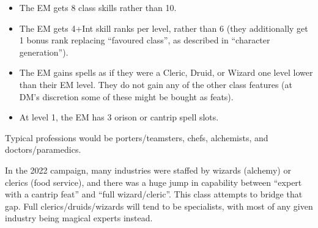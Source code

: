 \begin{itemize}
\item The EM gets 8 class skills rather than 10.
\item The EM gets 4+Int skill ranks per level, rather than 6 (they
additionally get 1 bonus rank replacing ``favoured class'', as described
in ``character generation'').
\item The EM gains spells as if they were a Cleric, Druid, or Wizard one
level lower than their EM level. They do not gain any of the other class
features (at DM's discretion some of these might be bought as feats).
\item At level 1, the EM has 3 orison or cantrip spell slots.
\end{itemize}
%

Typical professions would be porters/teamsters, chefs, alchemists, and
doctors/paramedics.

In the 2022 campaign, many industries were staffed by wizards (alchemy) or
clerics (food service), and there was a huge jump in capability between
``expert with a cantrip feat'' and ``full wizard/cleric''. This class
attempts to bridge that gap. Full clerics/druids/wizards will tend to be
specialists, with most of any given industry being magical experts instead.

%
